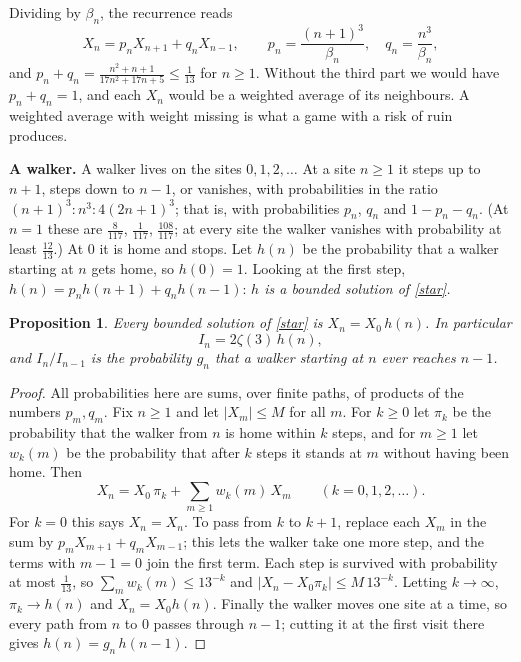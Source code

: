 \documentclass[11pt]{article}
\newtheorem{proposition}[lemma]{Proposition}
\newcommand{\q}[1]{\medskip\noindent\textbf{#1}}
\begin{document}
Dividing by $\beta_n$, the recurrence reads
\[
X_n=p_nX_{n+1}+q_nX_{n-1},\qquad p_n=\frac{(n+1)^3}{\beta_n},\quad q_n=\frac{n^3}{\beta_n},
\]
and $p_n+q_n=\frac{n^2+n+1}{17n^2+17n+5}\le\frac1{13}$ for $n\ge1$.
Without the third part we would have $p_n+q_n=1$, and each $X_n$ would be a weighted average of its
neighbours. A weighted average with weight missing is what a game with a risk of ruin produces.

\q{A walker.} A walker lives on the sites $0,1,2,\dots$ At a site $n\ge1$ it steps up to $n+1$,
steps down to $n-1$, or vanishes, with probabilities in the ratio $(n+1)^3:n^3:4(2n+1)^3$; that is,
with probabilities $p_n$, $q_n$ and $1-p_n-q_n$. (At $n=1$ these are $\frac8{117}$, $\frac1{117}$,
$\frac{108}{117}$; at every site the walker vanishes with probability at least $\frac{12}{13}$.)
At $0$ it is home and stops. Let $h(n)$ be the probability that a walker starting at $n$ gets home,
so $h(0)=1$. Looking at the first step, $h(n)=p_nh(n+1)+q_nh(n-1)$: \emph{$h$ is a bounded solution
of \eqref{star}.}

\begin{proposition}\label{prop:walker}
Every bounded solution of \eqref{star} is $X_n=X_0\,h(n)$. In particular
\[
I_n=2\zeta(3)\,h(n),
\]
and $I_n/I_{n-1}$ is the probability $g_n$ that a walker starting at $n$ ever reaches $n-1$.
\end{proposition}
\begin{proof}
All probabilities here are sums, over finite paths, of products of the numbers $p_m,q_m$. Fix
$n\ge1$ and let $|X_m|\le M$ for all $m$. For $k\ge0$ let $\pi_k$ be the probability that the walker
from $n$ is home within $k$ steps, and for $m\ge1$ let $w_k(m)$ be the probability that after $k$
steps it stands at $m$ without having been home. Then
\[
X_n=X_0\,\pi_k+\sum_{m\ge1}w_k(m)\,X_m\qquad(k=0,1,2,\dots).
\]
For $k=0$ this says $X_n=X_n$. To pass from $k$ to $k+1$, replace each $X_m$ in the sum by
$p_mX_{m+1}+q_mX_{m-1}$; this lets the walker take one more step, and the terms with $m-1=0$ join the
first term. Each step is survived with probability at most $\frac1{13}$, so
$\sum_mw_k(m)\le13^{-k}$ and $|X_n-X_0\pi_k|\le M\,13^{-k}$. Letting $k\to\infty$, $\pi_k\to h(n)$
and $X_n=X_0h(n)$. Finally the walker moves one site at a time, so every path from $n$ to $0$ passes
through $n-1$; cutting it at the first visit there gives $h(n)=g_n\,h(n-1)$.
\end{proof}
\end{document}
